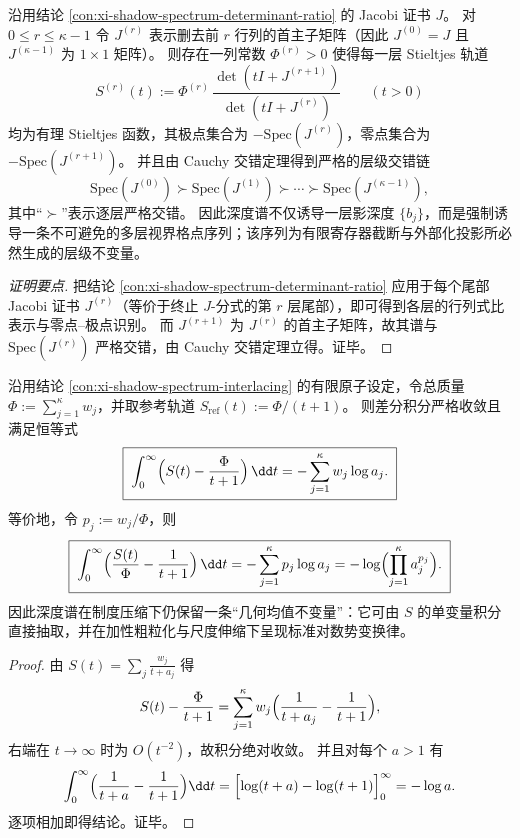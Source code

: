 \begin{proposition}\label{prop:xi-shadow-spectrum-tower-principal-minors}
沿用结论 \ref{con:xi-shadow-spectrum-determinant-ratio} 的 Jacobi 证书 \(J\)。
对 \(0\le r\le \kappa-1\) 令 \(J^{(r)}\) 表示删去前 \(r\) 行列的首主子矩阵（因此 \(J^{(0)}=J\) 且 \(J^{(\kappa-1)}\) 为 \(1\times 1\) 矩阵）。
则存在一列常数 \(\Phi^{(r)}>0\) 使得每一层 Stieltjes 轨道
\[
S^{(r)}(t):=\Phi^{(r)}\,\frac{\det(tI+J^{(r+1)})}{\det(tI+J^{(r)})}\qquad (t>0)
\]
均为有理 Stieltjes 函数，其极点集合为 \(-\mathrm{Spec}(J^{(r)})\)，零点集合为 \(-\mathrm{Spec}(J^{(r+1)})\)。
并且由 Cauchy 交错定理得到严格的层级交错链
\[
\boxed{\;
\mathrm{Spec}(J^{(0)}) \succ \mathrm{Spec}(J^{(1)}) \succ \cdots \succ \mathrm{Spec}(J^{(\kappa-1)}),\;}
\]
其中“\(\succ\)”表示逐层严格交错。
因此深度谱不仅诱导一层影深度 \(\{b_j\}\)，而是强制诱导一条不可避免的多层视界格点序列；该序列为有限寄存器截断与外部化投影所必然生成的层级不变量。
\end{proposition}
\begin{proof}[证明要点]
把结论 \ref{con:xi-shadow-spectrum-determinant-ratio} 应用于每个尾部 Jacobi 证书 \(J^{(r)}\)（等价于终止 \(J\)-分式的第 \(r\) 层尾部），即可得到各层的行列式比表示与零点--极点识别。
而 \(J^{(r+1)}\) 为 \(J^{(r)}\) 的首主子矩阵，故其谱与 \(\mathrm{Spec}(J^{(r)})\) 严格交错，由 Cauchy 交错定理立得。证毕。
\end{proof}



\begin{proposition}\label{prop:xi-logpotential-integral-geomean}
沿用结论 \ref{con:xi-shadow-spectrum-interlacing} 的有限原子设定，令总质量 \(\Phi:=\sum_{j=1}^{\kappa}w_j\)，并取参考轨道
\(
S_{\mathrm{ref}}(t):=\Phi/(t+1)
\)。
则差分积分严格收敛且满足恒等式
\[
\boxed{\;
\int_{0}^{\infty}\Bigl(S(t)-\frac{\Phi}{t+1}\Bigr)\,\dd t
=-\sum_{j=1}^{\kappa}w_j\log a_j.\;}
\]
等价地，令 \(p_j:=w_j/\Phi\)，则
\[
\boxed{\;
\int_{0}^{\infty}\Bigl(\frac{S(t)}{\Phi}-\frac{1}{t+1}\Bigr)\,\dd t
=-\sum_{j=1}^{\kappa}p_j\log a_j
=-\log\Bigl(\prod_{j=1}^{\kappa}a_j^{p_j}\Bigr).\;}
\]
因此深度谱在制度压缩下仍保留一条“几何均值不变量”：它可由 \(S\) 的单变量积分直接抽取，并在加性粗粒化与尺度伸缩下呈现标准对数势变换律。
\end{proposition}
\begin{proof}
由 \(S(t)=\sum_j\frac{w_j}{t+a_j}\) 得
\[
S(t)-\frac{\Phi}{t+1}
=\sum_{j=1}^{\kappa}w_j\Bigl(\frac{1}{t+a_j}-\frac{1}{t+1}\Bigr),
\]
右端在 \(t\to\infty\) 时为 \(O(t^{-2})\)，故积分绝对收敛。
并且对每个 \(a>1\) 有
\[
\int_0^\infty\Bigl(\frac{1}{t+a}-\frac{1}{t+1}\Bigr)\dd t
=\Bigl[\log(t+a)-\log(t+1)\Bigr]_{0}^{\infty}
=-\log a.
\]
逐项相加即得结论。证毕。
\end{proof}

